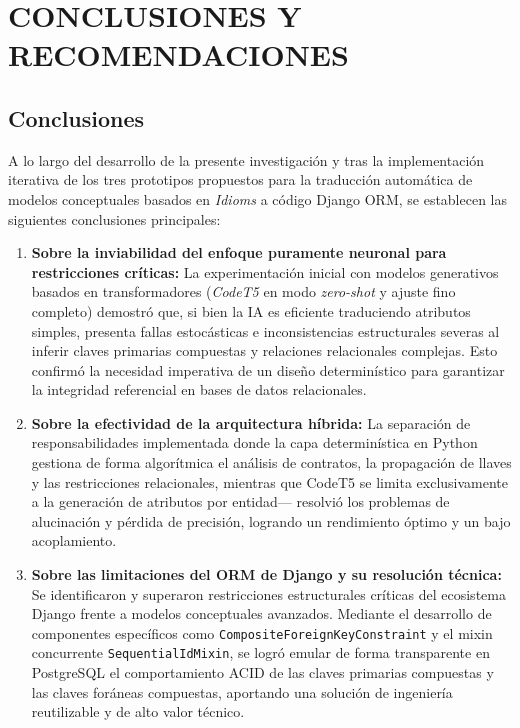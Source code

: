 \chapter{CONCLUSIONES Y RECOMENDACIONES}
\label{cap:conclusiones}

\section{Conclusiones}
\label{sec:conclusiones}

A lo largo del desarrollo de la presente investigación y tras la implementación iterativa de los tres prototipos propuestos para la traducción automática de modelos conceptuales basados en \textit{Idioms} a código Django ORM, se establecen las siguientes conclusiones principales:

\begin{enumerate}
    \item \textbf{Sobre la inviabilidad del enfoque puramente neuronal para restricciones críticas:} La experimentación inicial con modelos generativos basados en transformadores (\textit{CodeT5} en modo \textit{zero-shot} y ajuste fino completo) demostró que, si bien la IA es eficiente traduciendo atributos simples, presenta fallas estocásticas e inconsistencias estructurales severas al inferir claves primarias compuestas y relaciones relacionales complejas. Esto confirmó la necesidad imperativa de un diseño determinístico para garantizar la integridad referencial en bases de datos relacionales.
    
    \item \textbf{Sobre la efectividad de la arquitectura híbrida:} La separación de responsabilidades implementada donde la capa determinística en Python gestiona de forma algorítmica el análisis de contratos, la propagación de llaves y las restricciones relacionales, mientras que CodeT5 se limita exclusivamente a la generación de atributos por entidad— resolvió los problemas de alucinación y pérdida de precisión, logrando un rendimiento óptimo y un bajo acoplamiento.
    
    \item \textbf{Sobre las limitaciones del ORM de Django y su resolución técnica:} Se identificaron y superaron restricciones estructurales críticas del ecosistema Django frente a modelos conceptuales avanzados. Mediante el desarrollo de componentes específicos como \texttt{CompositeForeignKeyConstraint} y el mixin concurrente \texttt{SequentialIdMixin}, se logró emular de forma transparente en PostgreSQL el comportamiento ACID de las claves primarias compuestas y las claves foráneas compuestas, aportando una solución de ingeniería reutilizable y de alto valor técnico.
    

\end{enumerate}
